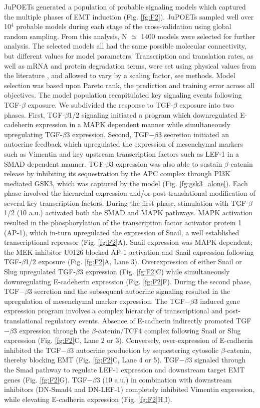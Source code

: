 \documentclass[11pt,letterpaper]{article}
\begin{document}
JuPOETs generated a population of probable signaling models which captured the multiple phases of EMT induction (Fig. \ref{fg:F2}).
JuPOETs sampled well over 10$^4$ probable models during each stage of the cross-validation using global random sampling.
From this analysis, N $\simeq$ 1400 models were selected for further analysis.
The selected models all had the same possible molecular connectivity, but different values for model parameters.
Transcription and translation rates, as well as mRNA and protein degradation terms, were set using physical values from the literature \cite{Milo:2010aa},
and allowed to vary by a scaling factor, see methods.
Model selection was based upon Pareto rank, the prediction and training error across all objectives.
The model population recapitulated key signaling events following TGF-$\beta$ exposure.
We subdivided the response to TGF-$\beta$ exposure into two phases.
First, TGF-$\beta$1/2 signaling initiated a program which downregulated E-cadeherin expression in a MAPK dependent manner while
simultaneously upregulating TGF-$\beta$3 expression. Second, TGF$-\beta$3 secretion initiated an autocrine feedback which upregulated the expression of
mesenchymal markers such as Vimentin and key upstream transcription factors such as LEF-1 in a SMAD dependent manner.
TGF-$\beta$3 expression was also able to sustain $\beta$-catenin release by inhibiting its sequestration by the APC complex through PI3K mediated GSK3,
which was captured by the model (Fig. \ref{fg:gsk3_alone}).
Each phase involved the hierarchal expression and/or post-translational modification of several key transcription factors.
During the first phase, stimulation with TGF-$\beta$1/2 (10 a.u.) activated both the SMAD and MAPK pathways.
MAPK activation resulted in the phosphorylation of the transcription factor activator protein 1 (AP-1), which in-turn upregulated the expression of Snail, a well established transcriptional repressor (Fig. \ref{fg:F2}A).
Snail expression was MAPK-dependent; the MEK inhibitor U0126 blocked AP-1 activation and Snail expression following TGF-$\beta$1/2 exposure (Fig. \ref{fg:F2}A, Lane 3).
Overexpression of either Snail or Slug upregulated TGF-$\beta$3 expression (Fig. \ref{fg:F2}C) while simultaneously downregulating E-cadeherin expression (Fig. \ref{fg:F2}F).
During the second phase, TGF$-\beta$3 secretion and the subsequent autocrine signaling resulted in the upregulation of mesenchymal marker expression.
The TGF$-\beta$3 induced gene expression program involves a complex hierarchy of transcriptional and post-translational regulatory events.
Absence of E-cadherin indirectly promoted TGF$-\beta$3 expression through the $\beta$-catenin/TCF4 complex following Snail or Slug expression (Fig. \ref{fg:F2}C, Lane 2 or 3).
Conversely, over-expression of E-cadherin inhibited the TGF$-\beta$3 autocrine production by sequestering cytosolic $\beta$-catenin, thereby blocking EMT (Fig. \ref{fg:F2}C, Lane 4 or 5).
TGF$-\beta$3 signaled through the Smad pathway to regulate LEF-1 expression and downstream target EMT genes (Fig. \ref{fg:F2}G).
TGF$-\beta$3 (10 a.u.) in combination with downstream inhibitors (DN-Smad4 and DN-LEF-1) completely inhibited Vimentin expression, while elevating E-cadherin expression (Fig. \ref{fg:F2}H,I).
\end{document}
